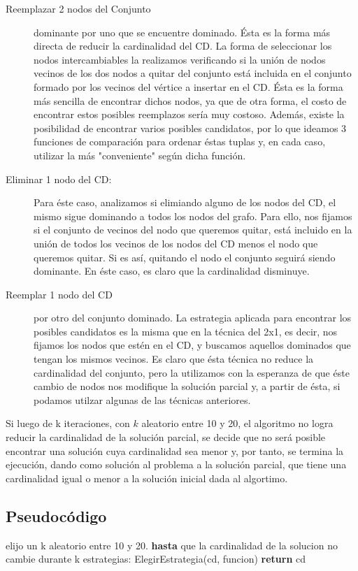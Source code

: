 \begin{description}
\item[Reemplazar 2 nodos del Conjunto] dominante por uno que se encuentre dominado. Ésta es la forma más directa de reducir la cardinalidad del CD. La forma de seleccionar los nodos intercambiables la realizamos verificando si la unión de nodos vecinos de los dos nodos a quitar del conjunto está incluida en el conjunto formado por los vecinos del vértice a insertar en el CD. Ésta es la forma más sencilla de encontrar dichos nodos, ya que de otra forma, el costo de encontrar estos posibles reemplazos sería muy costoso. Además, existe la posibilidad de encontrar varios posibles candidatos, por lo que ideamos 3 funciones de comparación para ordenar éstas tuplas y, en cada caso, utilizar la más "conveniente" según dicha función.
\item[Eliminar 1 nodo del CD:] Para éste caso, analizamos si elimiando alguno de los nodos del CD, el mismo sigue dominando a todos los nodos del grafo. Para ello, nos fijamos si el conjunto de vecinos del nodo que queremos quitar, está incluido en la unión de todos los vecinos de los nodos del CD menos el nodo que queremos quitar. Si es así, quitando el nodo el conjunto seguirá siendo dominante. En éste caso, es claro que la cardinalidad disminuye.
\item[Reemplar 1 nodo del CD] por otro del conjunto dominado. La estrategia aplicada para encontrar los posibles candidatos es la misma que en la técnica del 2x1, es decir, nos fijamos los nodos que estén en el CD, y buscamos aquellos dominados que tengan los mismos vecinos. Es claro que ésta técnica no reduce la cardinalidad del conjunto, pero la utilizamos con la esperanza de que éste cambio de nodos nos modifique la solución parcial y, a partir de ésta, si podamos utilzar algunas de las técnicas anteriores.
\end{description}

Si luego de k iteraciones, con $k$ aleatorio entre 10 y 20, el algoritmo no logra reducir la cardinalidad de la solución parcial, se decide que no será posible encontrar una solución cuya cardinalidad sea menor y, por tanto, se termina la ejecución, dando como solución al problema a la solución parcial, que tiene una cardinalidad igual o menor a la solución inicial dada al algortimo.

\subsection{Pseudocódigo}
\begin{codebox}
\li	elijo un k aleatorio entre 10 y 20.
\li	\textbf{hasta} que la cardinalidad de la solucion no cambie durante k estrategias: \Do
\li		ElegirEstrategia(cd, funcion)
\End
\End
\li	\textbf{return} cd
\end{codebox}


